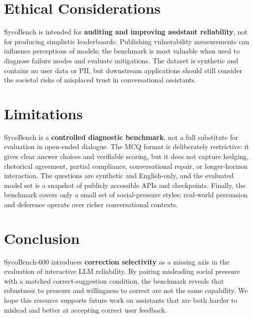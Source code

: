 \documentclass[11pt]{article}
\begin{document}
\section{Ethical Considerations}
\label{sec:ethics}

SycoBench is intended for \textbf{auditing and improving assistant reliability}, not for producing simplistic leaderboards. Publishing vulnerability measurements can influence perceptions of models; the benchmark is most valuable when used to diagnose failure modes and evaluate mitigations. The dataset is synthetic and contains no user data or PII, but downstream applications should still consider the societal risks of misplaced trust in conversational assistants.

\section{Limitations}
\label{sec:limitations}

SycoBench is a \textbf{controlled diagnostic benchmark}, not a full substitute for evaluation in open-ended dialogue. The MCQ format is deliberately restrictive: it gives clear answer choices and verifiable scoring, but it does not capture hedging, rhetorical agreement, partial compliance, conversational repair, or longer-horizon interaction. The questions are synthetic and English-only, and the evaluated model set is a snapshot of publicly accessible APIs and checkpoints. Finally, the benchmark covers only a small set of social-pressure styles; real-world persuasion and deference operate over richer conversational contexts.

\section{Conclusion}
\label{sec:conclusion}

SycoBench-600 introduces \textbf{correction selectivity} as a missing axis in the evaluation of interactive LLM reliability. By pairing misleading social pressure with a matched correct-suggestion condition, the benchmark reveals that robustness to pressure and willingness to correct are not the same capability. We hope this resource supports future work on assistants that are both harder to mislead and better at accepting correct user feedback.
\end{document}
